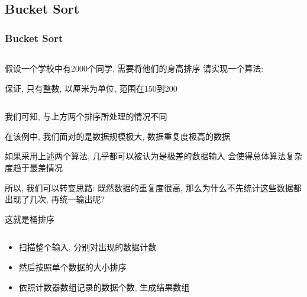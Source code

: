 \documentclass[en, 11pt, xcolor=dvipsnames]{beamer}
\begin{document}
\subsection{Bucket Sort}
\begin{frame}[fragile]
	\frametitle{Bucket Sort}


	\begin{columns}[c]
		\begin{column}{0.98\textwidth}

			假设一个学校中有2000个同学, 需要将他们的身高排序
			请实现一个算法:

			保证, 只有整数, 以厘米为单位, 范围在150到200

		\end{column}
	\end{columns}
\end{frame}

\begin{frame}[fragile]


	\begin{columns}[c]
		\begin{column}{0.98\textwidth}

			我们可知, 与上方两个排序所处理的情况不同

			在该例中, 我们面对的是数据规模极大, 数据重复度极高的数据

			如果采用上述两个算法, 几乎都可以被认为是极差的数据输入
			会使得总体算法复杂度趋于最差情况

			所以, 我们可以转变思路:
			既然数据的重复度很高, 那么为什么不先统计这些数据都出现了几次,
			再统一输出呢?

			这就是桶排序

		\end{column}
	\end{columns}
\end{frame}

\begin{frame}[fragile]


	\begin{columns}[c]
		\begin{column}{0.98\textwidth}

			\begin{itemize}
				\item 扫描整个输入, 分别对出现的数据计数
				\item 然后按照单个数据的大小排序
				\item 依照计数器数组记录的数据个数, 生成结果数组
			\end{itemize}

		\end{column}
	\end{columns}
\end{frame}
\end{document}
